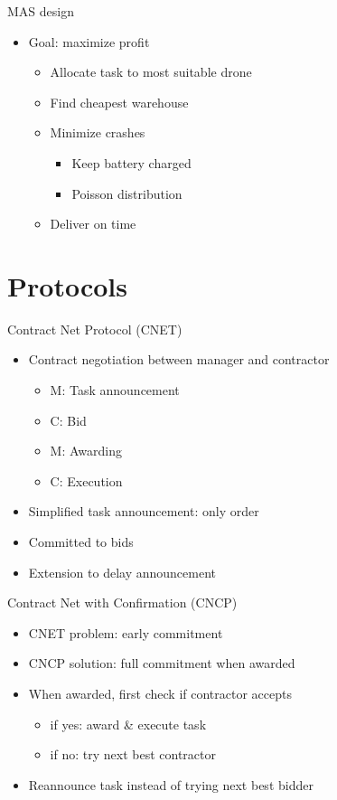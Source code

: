 \documentclass{beamer}
\begin{document}
	\begin{frame}{MAS design}
		\begin{itemize}
			\item Goal: maximize profit
			\begin{itemize}
				\item Allocate task to most suitable drone
				\item Find cheapest warehouse
				\item Minimize crashes
				\begin{itemize}
					\item Keep battery charged
					\item Poisson distribution
				\end{itemize}
				\item Deliver on time
			\end{itemize}
		\end{itemize}
	\end{frame}
	
	\section{Protocols}
		
	\begin{frame}{Contract Net Protocol (CNET)}
		\begin{itemize}
			\item Contract negotiation between manager and contractor
			\begin{itemize}
				\item M: Task announcement
				\item C: Bid
				\item M: Awarding
				\item C: Execution
			\end{itemize}
			\item Simplified task announcement: only order
			\item Committed to bids
			\item Extension to delay announcement
		\end{itemize}
	\end{frame}
	
	\begin{frame}{Contract Net with Confirmation (CNCP)}
		\begin{itemize}
			\item CNET problem: early commitment
			\item CNCP solution: full commitment when awarded
			\item When awarded, first check if contractor accepts
			\begin{itemize}
				\item if yes: award \& execute task
				\item if no: try next best contractor
			\end{itemize}
			\item Reannounce task instead of trying next best bidder
		\end{itemize}
	\end{frame}
\end{document}
